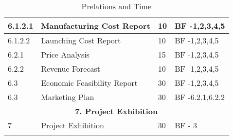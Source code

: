 \begin{longtable}{ | p{1.3cm} | p{7cm} | p{3cm} | p{3.5cm} |}
6.1.2.1 & Manufacturing Cost Report & 10 & BF -1,2,3,4,5  \\ \hline
6.1.2.2 & Launching Cost Report  & 10 & BF -1,2,3,4,5 \\ \hline
6.2.1 & Price Analysis & 15 & BF -1,2,3,4,5  \\ \hline
6.2.2 & Revenue Forecast & 10 & BF -1,2,3,4,5  \\ \hline
6.3 & Economic Feasibility Report & 30 & BF -1,2,3,4,5 \\ \hline
6.3 & Marketing Plan & 30 & BF -6.2.1,6.2.2 \\ \hline
\multicolumn{4}{|c|}{\textbf{7. Project Exhibition}} \\ \hline
7 & Project Exhibition &30 & BF - 3 \\ \hline
\caption{Prelations and Time} \\
\end{longtable}